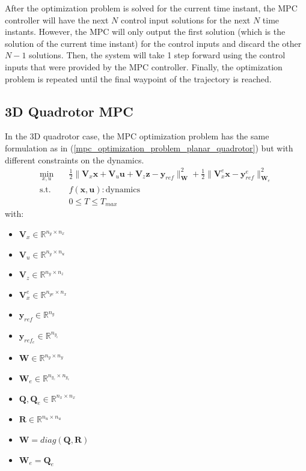 \documentclass{thesisreport}
\begin{document}
After the optimization problem is solved for the current time instant, the MPC controller will have the next $N$ control input solutions for the next $N$ time instants. However, the MPC will only output the first solution (which is the solution of the current time instant) for the control inputs and discard the other $N-1$ solutions. Then, the system will take 1 step forward using the control inputs that were provided by the MPC controller. Finally, the optimization problem is repeated until the final waypoint of the trajectory is reached.

\newpage

\subsection{3D Quadrotor MPC}

In the 3D quadrotor case, the MPC optimization problem has the same formulation as in (\ref{mpc_optimization_problem_planar_quadrotor})
but with different constraints on the dynamics.
	\begin{equation}\label{mpc_optimization_problem_3d_quadrotor}
\begin{aligned}
            \min_{x,u} \quad & \frac{1}{2}\|\bm{V}_x \bm{x} + \bm{V}_u \bm{u} + \bm{V}_z \bm{z} - \bm{y}_{ref}\|^2_{\bm{W}} + \frac{1}{2}\|\bm{V}_x^e \bm{x} - \bm{y}_{ref}^e \|^2_{\bm{W}_e} \\
            \textrm{s.t.} \quad & f(\bm{x},\bm{u}):\text{dynamics} \\
            & 0 \leq T \leq T_{max}
        \end{aligned}
\end{equation}
with: 
\begin{multicols}{3}
\begin{itemize}
	\item $\bm{V}_x \in \mathbb{R}^{n_y \times n_x}$
	\item $\bm{V}_u \in \mathbb{R}^{n_y \times n_u}$ 
	\item $\bm{V}_z \in \mathbb{R}^{n_y \times n_z}$
	\item $\bm{V}_x^e \in \mathbb{R}^{n_{ye}\times n_x}$
\end{itemize}
\columnbreak
\begin{itemize}
	\item $\bm{y}_{ref} \in \mathbb{R}^{n_y}$
	\item $\bm{y}_{ref_e} \in \mathbb{R}^{n_{y_e}}$
	\item $\bm{W} \in \mathbb{R}^{n_y \times n_y}$
	\item $\bm{W}_e \in \mathbb{R}^{n_{y_e} \times n_{y_e}}$
\end{itemize}
\columnbreak
\begin{itemize}
	\item $\bm{Q},\bm{Q}_e \in \mathbb{R}^{n_x \times n_x}$
	\item $\bm{R} \in \mathbb{R}^{n_u \times n_u}$
	\item $\bm{W} = diag(\bm{Q},\bm{R}) $
	\item $\bm{W}_e = \bm{Q}_e $
\end{itemize}
\end{multicols}
\end{document}
